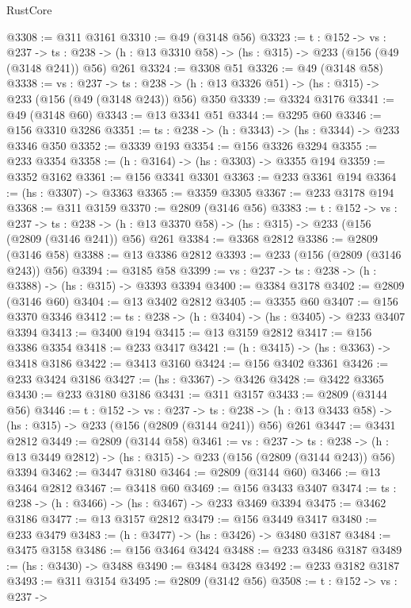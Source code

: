 \begin{lexlean}{RustCore}
\begin{coremodule}
@3308 := @311 @3161
@3310 := @49 (@3148 @56)
@3323 := {t : @152} ->
  {vs : @237} ->
  {ts : @238} -> (h : @13 @3310 @58) -> (hs : @315) -> @233 (@156 (@49 (@3148 @241)) @56) @261
@3324 := @3308 @51
@3326 := @49 (@3148 @58)
@3338 := {vs : @237} ->
  {ts : @238} -> (h : @13 @3326 @51) -> (hs : @315) -> @233 (@156 (@49 (@3148 @243)) @56) @350
@3339 := @3324 @3176
@3341 := @49 (@3148 @60)
@3343 := @13 @3341 @51
@3344 := @3295 @60
@3346 := @156 @3310 @3286
@3351 := {ts : @238} -> (h : @3343) -> (hs : @3344) -> @233 @3346 @350
@3352 := @3339 @193
@3354 := @156 @3326 @3294
@3355 := @233 @3354
@3358 := (h : @3164) -> (hs : @3303) -> @3355 @194
@3359 := @3352 @3162
@3361 := @156 @3341 @3301
@3363 := @233 @3361 @194
@3364 := (hs : @3307) -> @3363
@3365 := @3359 @3305
@3367 := @233 @3178 @194
@3368 := @311 @3159
@3370 := @2809 (@3146 @56)
@3383 := {t : @152} ->
  {vs : @237} ->
  {ts : @238} -> (h : @13 @3370 @58) -> (hs : @315) -> @233 (@156 (@2809 (@3146 @241)) @56) @261
@3384 := @3368 @2812
@3386 := @2809 (@3146 @58)
@3388 := @13 @3386 @2812
@3393 := @233 (@156 (@2809 (@3146 @243)) @56)
@3394 := @3185 @58
@3399 := {vs : @237} -> {ts : @238} -> (h : @3388) -> (hs : @315) -> @3393 @3394
@3400 := @3384 @3178
@3402 := @2809 (@3146 @60)
@3404 := @13 @3402 @2812
@3405 := @3355 @60
@3407 := @156 @3370 @3346
@3412 := {ts : @238} -> (h : @3404) -> (hs : @3405) -> @233 @3407 @3394
@3413 := @3400 @194
@3415 := @13 @3159 @2812
@3417 := @156 @3386 @3354
@3418 := @233 @3417
@3421 := (h : @3415) -> (hs : @3363) -> @3418 @3186
@3422 := @3413 @3160
@3424 := @156 @3402 @3361
@3426 := @233 @3424 @3186
@3427 := (hs : @3367) -> @3426
@3428 := @3422 @3365
@3430 := @233 @3180 @3186
@3431 := @311 @3157
@3433 := @2809 (@3144 @56)
@3446 := {t : @152} ->
  {vs : @237} ->
  {ts : @238} -> (h : @13 @3433 @58) -> (hs : @315) -> @233 (@156 (@2809 (@3144 @241)) @56) @261
@3447 := @3431 @2812
@3449 := @2809 (@3144 @58)
@3461 := {vs : @237} ->
  {ts : @238} -> (h : @13 @3449 @2812) -> (hs : @315) -> @233 (@156 (@2809 (@3144 @243)) @56) @3394
@3462 := @3447 @3180
@3464 := @2809 (@3144 @60)
@3466 := @13 @3464 @2812
@3467 := @3418 @60
@3469 := @156 @3433 @3407
@3474 := {ts : @238} -> (h : @3466) -> (hs : @3467) -> @233 @3469 @3394
@3475 := @3462 @3186
@3477 := @13 @3157 @2812
@3479 := @156 @3449 @3417
@3480 := @233 @3479
@3483 := (h : @3477) -> (hs : @3426) -> @3480 @3187
@3484 := @3475 @3158
@3486 := @156 @3464 @3424
@3488 := @233 @3486 @3187
@3489 := (hs : @3430) -> @3488
@3490 := @3484 @3428
@3492 := @233 @3182 @3187
@3493 := @311 @3154
@3495 := @2809 (@3142 @56)
@3508 := {t : @152} ->
  {vs : @237} ->

\end{coremodule}
\end{lexlean}

